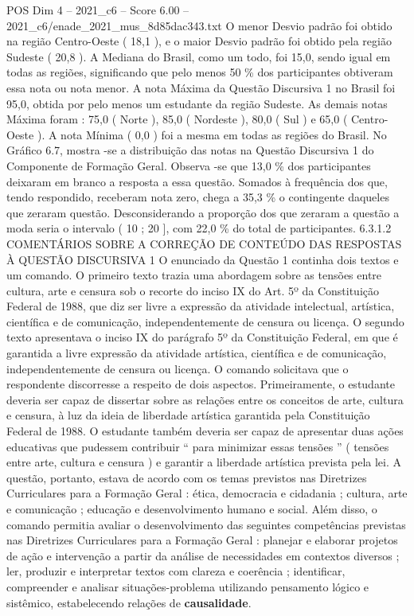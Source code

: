 \begin{textsample}{POS Dim 4 – 2021\_c6 – Score 6.00 – 2021\_c6/enade\_2021\_mus\_8d85dac343.txt}
O menor Desvio padrão foi obtido na região Centro-Oeste ( 18,1 ), e o maior Desvio padrão foi obtido pela região Sudeste ( 20,8 ).
A Mediana do Brasil, como um todo, foi 15,0, sendo igual em todas as regiões, significando que pelo menos 50 \% dos participantes obtiveram essa nota ou nota menor.
A nota Máxima da Questão Discursiva 1 no Brasil foi 95,0, obtida por pelo menos um estudante da região Sudeste.
As demais notas Máxima foram : 75,0 ( Norte ), 85,0 ( Nordeste ), 80,0 ( Sul ) e 65,0 ( Centro-Oeste ).
A nota Mínima ( 0,0 ) foi a mesma em todas as regiões do Brasil.
No Gráfico 6.7, mostra -se a distribuição das notas na Questão Discursiva 1 do Componente de Formação Geral.
Observa -se que 13,0 \% dos participantes deixaram em branco a resposta a essa questão.
Somados à frequência dos que, tendo respondido, receberam nota zero, chega a 35,3 \% o contingente daqueles que zeraram questão.
Desconsiderando a proporção dos que zeraram a questão a moda seria o intervalo ( 10 ; 20 ], com 22,0 \% do total de participantes. 6.3.1.2 COMENTÁRIOS SOBRE A CORREÇÃO DE CONTEÚDO DAS RESPOSTAS À QUESTÃO DISCURSIVA 1 O enunciado da Questão 1 continha dois textos e um comando.
O primeiro texto trazia uma abordagem sobre as tensões entre cultura, arte e censura sob o recorte do inciso IX do Art. 5º da Constituição Federal de 1988, que diz ser livre a expressão da atividade intelectual, artística, científica e de comunicação, independentemente de censura ou licença.
O segundo texto apresentava o inciso IX do parágrafo 5º da Constituição Federal, em que é garantida a livre expressão da atividade artística, científica e de comunicação, independentemente de censura ou licença.
O comando solicitava que o respondente discorresse a respeito de dois aspectos.
Primeiramente, o estudante deveria ser capaz de dissertar sobre as relações entre os conceitos de arte, cultura e censura, à luz da ideia de liberdade artística garantida pela Constituição Federal de 1988.
O estudante também deveria ser capaz de apresentar duas ações educativas que pudessem contribuir “ para minimizar essas tensões ” ( tensões entre arte, cultura e censura ) e garantir a liberdade artística prevista pela lei.
A questão, portanto, estava de acordo com os temas previstos nas Diretrizes Curriculares para a Formação Geral : ética, democracia e cidadania ; cultura, arte e comunicação ; educação e desenvolvimento humano e social.
Além disso, o comando permitia avaliar o desenvolvimento das seguintes competências previstas nas Diretrizes Curriculares para a Formação Geral : planejar e elaborar projetos de ação e intervenção a partir da análise de necessidades em contextos diversos ; ler, produzir e interpretar textos com clareza e coerência ; identificar, compreender e analisar situações-problema utilizando pensamento lógico e sistêmico, estabelecendo relações de \textbf{causalidade}.

\end{textsample}
